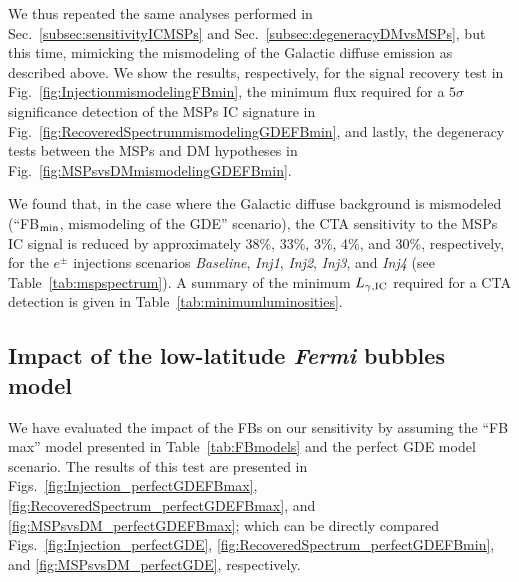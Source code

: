 \documentclass[doublespace,nopageskip]{VTthesis}
\begin{document}
We thus repeated the same analyses performed in Sec.~\ref{subsec:sensitivityICMSPs} and Sec.~\ref{subsec:degeneracyDMvsMSPs}, but this time, mimicking the mismodeling of the Galactic diffuse emission as described above. We show the results, respectively, for the signal recovery test in Fig.~\ref{fig:InjectionmismodelingFBmin}, the minimum flux required for a $5\sigma$ significance detection of the MSPs IC signature in Fig.~\ref{fig:RecoveredSpectrummismodelingGDEFBmin}, and lastly, the degeneracy tests between the MSPs and DM hypotheses in Fig.~\ref{fig:MSPsvsDMmismodelingGDEFBmin}. 

We found that, in the case where the Galactic diffuse background is mismodeled (``FB$_{\rm min}$, mismodeling of the GDE'' scenario), the CTA sensitivity to the MSPs IC signal is reduced   by approximately 38\%, 33\%, 3\%, 4\%, and 30\%, respectively, for the $e^\pm$ injections scenarios  \textit{Baseline}, \textit{Inj1}, \textit{Inj2}, \textit{Inj3}, and \textit{Inj4} (see Table~\ref{tab:mspspectrum}). A summary of the minimum $L_{\gamma, {\rm IC}}$ required for a CTA detection is given in Table~\ref{tab:minimumluminosities}.

\subsection{Impact of the low-latitude \textit{Fermi} bubbles model}
\label{subsec:FBsImpact}

We have evaluated the impact of the FBs on our sensitivity by assuming the ``FB max'' model presented in Table~\ref{tab:FBmodels} and the perfect GDE model scenario. The results of this test are presented in Figs.~\ref{fig:Injection_perfectGDEFBmax}, \ref{fig:RecoveredSpectrum_perfectGDEFBmax}, and \ref{fig:MSPsvsDM_perfectGDEFBmax}; which can be directly compared Figs.~\ref{fig:Injection_perfectGDE}, \ref{fig:RecoveredSpectrum_perfectGDEFBmin}, and \ref{fig:MSPsvsDM_perfectGDE}, respectively.
 
\end{document}

